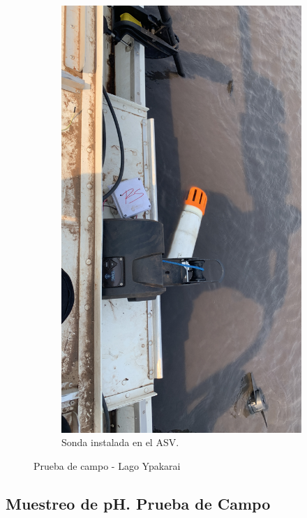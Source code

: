 \begin{figure}[H]
\begin{subfigure}[b]{0.3\textwidth}
         \includegraphics[width=\textwidth]{Imagenes/cap4/PruebaCampo1.JPG}
         \caption{Sonda instalada en el ASV.}
         \label{fig:SondaASV}
     \end{subfigure}
     \hfill
    \caption{Prueba de campo - Lago Ypakarai}
    \label{fig:PruebaCampo}
\end{figure}


\subsection{Muestreo de pH. Prueba de Campo}

